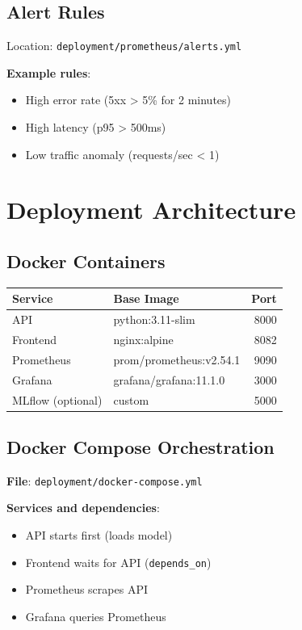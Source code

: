 \documentclass[12pt,a4paper]{article}
\newcommand{\code}[1]{\texttt{#1}}
\begin{document}
\subsection{Alert Rules}

Location: \code{deployment/prometheus/alerts.yml}

\textbf{Example rules}:
\begin{itemize}
    \item High error rate (5xx > 5\% for 2 minutes)
    \item High latency (p95 > 500ms)
    \item Low traffic anomaly (requests/sec < 1)
\end{itemize}

\section{Deployment Architecture}

\subsection{Docker Containers}

\begin{table}[H]
\centering
\small
\begin{tabular}{|l|l|r|}
\hline
\textbf{Service} & \textbf{Base Image} & \textbf{Port} \\
\hline
API & python:3.11-slim & 8000 \\
Frontend & nginx:alpine & 8082 \\
Prometheus & prom/prometheus:v2.54.1 & 9090 \\
Grafana & grafana/grafana:11.1.0 & 3000 \\
MLflow (optional) & custom & 5000 \\
\hline
\end{tabular}
\end{table}

\subsection{Docker Compose Orchestration}

\textbf{File}: \code{deployment/docker-compose.yml}

\textbf{Services and dependencies}:
\begin{itemize}
    \item API starts first (loads model)
    \item Frontend waits for API (\code{depends\_on})
    \item Prometheus scrapes API
    \item Grafana queries Prometheus
\end{itemize}
\end{document}
